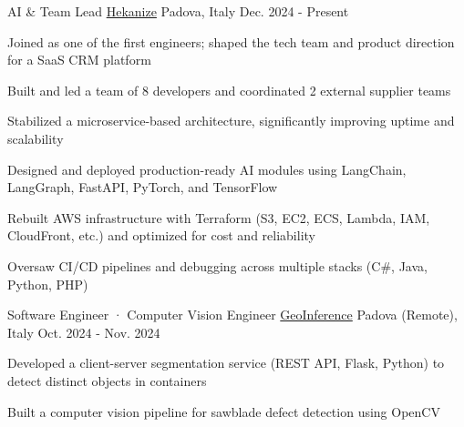 
\begin{cventries}

  \cventry
    {AI \& Team Lead} %
    {\href{https://www.hekanize.com}{Hekanize}} %
    {Padova, Italy} %
    {Dec. 2024 - Present} %
    {
      \begin{cvitems}
        \item {Joined as one of the first engineers; shaped the tech team and product direction for a SaaS CRM platform}
        \item {Built and led a team of 8 developers and coordinated 2 external supplier teams}
        \item {Stabilized a microservice-based architecture, significantly improving uptime and scalability}
        \item {Designed and deployed production-ready AI modules using LangChain, LangGraph, FastAPI, PyTorch, and TensorFlow}
        \item {Rebuilt AWS infrastructure with Terraform (S3, EC2, ECS, Lambda, IAM, CloudFront, etc.) and optimized for cost and reliability}
        \item {Oversaw CI/CD pipelines and debugging across multiple stacks (C\#, Java, Python, PHP)}
      \end{cvitems}
    }

  \cventry
    {Software Engineer · Computer Vision Engineer} %
    {\href{https://www.geoinference.com/en/homeeng/}{GeoInference}} %
    {Padova (Remote), Italy} %
    {Oct. 2024 - Nov. 2024} %
    {
      \begin{cvitems}
        \item {Developed a client-server segmentation service (REST API, Flask, Python) to detect distinct objects in containers} 
        \item {Built a computer vision pipeline for sawblade defect detection using OpenCV}
      \end{cvitems}
    }


\end{cventries}
